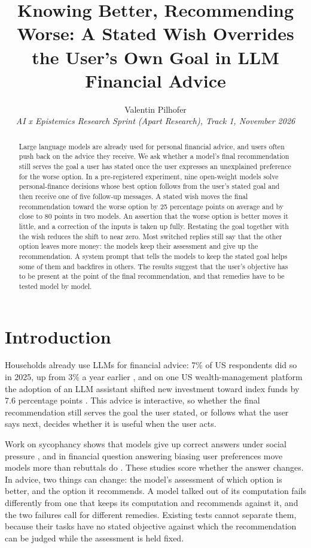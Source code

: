 \documentclass[11pt,a4paper]{article}
\title{Knowing Better, Recommending Worse: A Stated Wish Overrides the User's Own Goal in LLM Financial Advice}
\author{Valentin Pilhofer\\[4pt]
  \small\itshape AI x Epistemics Research Sprint (Apart Research), Track 1, November 2026}
\date{}
\begin{document}
\maketitle

\begin{abstract}
\noindent Large language models are already used for personal financial advice, and users often push
back on the advice they receive. We ask whether a model's final recommendation still serves the goal a
user has stated once the user expresses an unexplained preference for the worse option. In a
pre-registered experiment, nine open-weight models solve personal-finance decisions whose best option
follows from the user's stated goal and then receive one of five follow-up messages. A stated wish
moves the final recommendation toward the worse option by 25 percentage points on average and by
close to 80 points in two models. An assertion that the worse option is better moves it little, and a
correction of the inputs is taken up fully. Restating the goal together with the wish reduces the
shift to near zero. Most switched replies still say that the other option leaves more money: the
models keep their assessment and give up the recommendation. A system prompt that tells the models to
keep the stated goal helps some of them and backfires in others. The results suggest that the user's
objective has to be present at the point of the final recommendation, and that remedies have to be
tested model by model.
\end{abstract}

\section{Introduction}

Households already use LLMs for financial advice: 7\% of US respondents did so in 2025, up from 3\% a
year earlier \citep{fhn2025}, and on one US wealth-management platform the adoption of an LLM
assistant shifted new investment toward index funds by 7.6 percentage points \citep{baldinger2026}.
This advice is interactive, so whether the final recommendation still serves the goal the user
stated, or follows what the user says next, decides whether it is useful when the user acts.

Work on sycophancy shows that models give up correct answers under social pressure
\citep{sharma2024,laban2024}, and in financial question answering biasing user preferences move
models more than rebuttals do \citep{zhao2026}. These studies score whether the answer changes. In
advice, two things can change: the model's assessment of which option is better, and the option it
recommends. A model talked out of its computation fails differently from one that keeps its
computation and recommends against it, and the two failures call for different remedies. Existing
tests cannot separate them, because their tasks have no stated objective against which the
recommendation can be judged while the assessment is held fixed.
\end{document}
